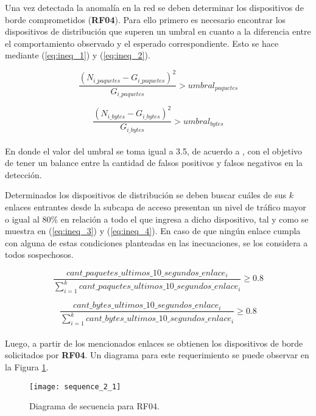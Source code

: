Una vez detectada la anomalía en la red se deben determinar los dispositivos de
borde comprometidos (\textbf{RF04}). Para ello primero es necesario encontrar
los dispositivos de distribución que superen un umbral en cuanto a la diferencia
entre el comportamiento observado y el esperado correspondiente. Esto se hace
mediante (\ref{eq:ineq_1}) y (\ref{eq:ineq_2}).

\begin{equation}\label{eq:ineq_1}
	{\frac{(N_{i\_paquetes}-G_{i\_paquetes})^2}{G_{i\_paquetes}}} > umbral_{paquetes}
\end{equation}

\begin{equation}\label{eq:ineq_2}
	{\frac{(N_{i\_bytes}-G_{i\_bytes})^2}{G_{i\_bytes}}} > umbral_{bytes}
\end{equation}\\

En donde el valor del umbral se toma igual a 3.5, de acuerdo a
\parencite{ddos_amir}, con el objetivo de tener un balance entre la cantidad de
falsos positivos y falsos negativos en la detección.

Determinados los dispositivos de distribución se deben buscar cuáles de sus
\(k\) enlaces entrantes desde la subcapa de acceso presentan un nivel de tráfico
mayor o igual al 80\% \parencite{estado_arte_2} en relación a todo el que
ingresa a dicho dispositivo, tal y como se muestra en (\ref{eq:ineq_3}) y
(\ref{eq:ineq_4}). En caso de que ningún enlace cumpla con alguna de estas
condiciones planteadas en las inecuaciones, se los considera a todos
sospechosos.

\begin{equation}\label{eq:ineq_3}
	{\frac{cant\_paquetes\_ultimos\_10\_segundos\_enlace_i}{\sum_{i=1}^{k}
      cant\_paquetes\_ultimos\_10\_segundos\_enlace_i}} \geq 0.8
\end{equation}

\begin{equation}\label{eq:ineq_4}
  {\frac{cant\_bytes\_ultimos\_10\_segundos\_enlace_i}{\sum_{i=1}^{k}
      cant\_bytes\_ultimos\_10\_segundos\_enlace_i}} \geq 0.8
\end{equation}\\

Luego, a partir de los mencionados enlaces se obtienen los dispositivos de borde
solicitados por \textbf{RF04}. Un diagrama para este requerimiento se puede
observar en la Figura \ref{fig:diagram2.1}.

\begin{figure}[H]
	\centering 
	\texttt{[image: sequence\_2\_1]}
	\caption{Diagrama de secuencia para RF04.}
	\label{fig:diagram2.1}
\end{figure}

